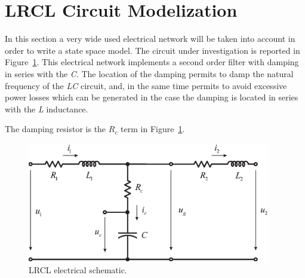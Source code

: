 \documentclass[11pt,a4paper,oneside]{book}
\numberwithin{equation}{section}
\theoremstyle{it}
\theoremstyle{definition}
\begin{document}
\section{LRCL Circuit Modelization}
In this section a very wide used electrical network will be taken into account in order to write a state space model. The circuit under investigation is reported in Figure~\ref{lrcl_fig1}. This electrical network implements a second order filter with damping in series with the \textit{C}. The location of the damping permits to damp the natural frequency of the \textit{LC} circuit, and, in the same time permits to avoid excessive power losses which can be generated in the case the damping is located in series with the \textit{L} inductance.

The damping resistor is the $R_c$ term in Figure~\ref{lrcl_fig1}.
\begin{figure}[H]
	\centering
	\includegraphics[width = 300pt, angle = 0, 
	keepaspectratio]{figures/lrcl_circuit/electric_schematic_LRCL_filter_2.eps}
	\captionsetup{width=0.5\textwidth, font=small}	
	\caption{LRCL electrical schematic.}
	\label{lrcl_fig1}
\end{figure}
\end{document}
